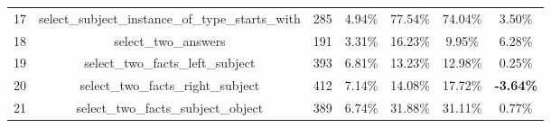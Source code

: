 \begin{table}[h!]
{\begin{tabular}{|c|c|cc|cc|c|}
    17                           & select\_subject\_instance\_of\_type\_starts\_with                                                                      & 285                                                 & 4.94\%                                                                          & 77.54\%                                                                                                & 74.04\%                                                                                & 3.50\%                                  \\
    18                           & select\_two\_answers                                                                                                   & 191                                                 & 3.31\%                                                                          & 16.23\%                                                                                                & 9.95\%                                                                                 & 6.28\%                                  \\
    19                           & select\_two\_facts\_left\_subject                                                                                      & 393                                                 & 6.81\%                                                                          & 13.23\%                                                                                                & 12.98\%                                                                                & 0.25\%                                  \\
    20                           & select\_two\_facts\_right\_subject                                                                                     & 412                                                 & 7.14\%                                                                          & 14.08\%                                                                                                & 17.72\%                                                                                & \textbf{-3.64\%}                        \\
    21                           & select\_two\_facts\_subject\_object                                                                                    & 389                                                 & 6.74\%                                                                          & 31.88\%                                                                                                & 31.11\%                                                                                & 0.77\%                                  \\

\end{tabular}}
\end{table}
